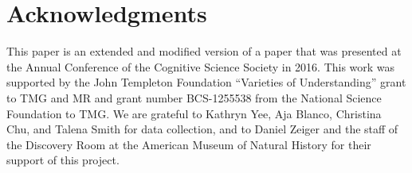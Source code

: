 \documentclass[man,floatsintext]{apa6}
\begin{document}

\section{Acknowledgments}

This paper is an extended and modified version of a paper that was presented at the Annual Conference of the Cognitive Science Society in 2016.
This work was supported by the John Templeton Foundation 
``Varieties of Understanding'' grant to TMG and MR and grant number
BCS-1255538 from the National Science Foundation to TMG.
We are grateful to Kathryn Yee, Aja Blanco, Christina Chu, and Talena Smith for data collection, and to Daniel Zeiger and the staff of the Discovery Room at the American Museum of Natural History for their support of this project.





\end{document}
